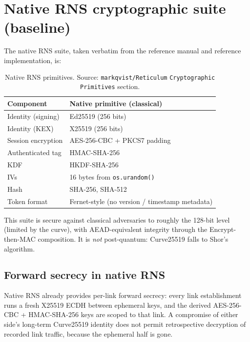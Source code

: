 \documentclass[11pt,a4paper]{article}
\begin{document}
\section{Native RNS cryptographic suite (baseline)}
\label{sec:rns-native}

The native RNS suite, taken verbatim from the reference manual and
reference implementation, is:

\begin{table}[H]
\centering
\small
\begin{tabularx}{\linewidth}{l X}
\toprule
\textbf{Component} & \textbf{Native primitive (classical)} \\
\midrule
Identity (signing) & Ed25519 (256 bits) \\
Identity (KEX) & X25519 (256 bits) \\
Session encryption & AES-256-CBC + PKCS7 padding \\
Authenticated tag & HMAC-SHA-256 \\
KDF & HKDF-SHA-256 \\
IVs & 16 bytes from \texttt{os.urandom()} \\
Hash & SHA-256, SHA-512 \\
Token format & Fernet-style (no version / timestamp metadata) \\
\bottomrule
\end{tabularx}
\caption{Native RNS primitives. Source: \texttt{markqvist/Reticulum}
\texttt{Cryptographic Primitives} section.}
\end{table}

This suite is secure against classical adversaries to roughly the
128-bit level (limited by the curve), with AEAD-equivalent integrity
through the Encrypt-then-MAC composition. It is \emph{not}
post-quantum: Curve25519 falls to Shor's algorithm.

\subsection{Forward secrecy in native RNS}

Native RNS already provides per-link forward secrecy: every link
establishment runs a fresh X25519 ECDH between ephemeral keys, and the
derived AES-256-CBC + HMAC-SHA-256 keys are scoped to that link. A
compromise of either side's long-term Curve25519 identity does not
permit retrospective decryption of recorded link traffic, because the
ephemeral half is gone.
\end{document}
